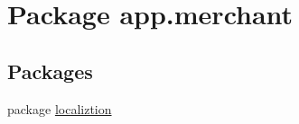 \hypertarget{namespaceapp_1_1merchant}{\section{Package app.\-merchant}
\label{namespaceapp_1_1merchant}
}
\subsection*{Packages}
\begin{DoxyCompactItemize}
\item 
package \hyperlink{namespaceapp_1_1merchant_1_1localiztion}{localiztion}
\end{DoxyCompactItemize}
